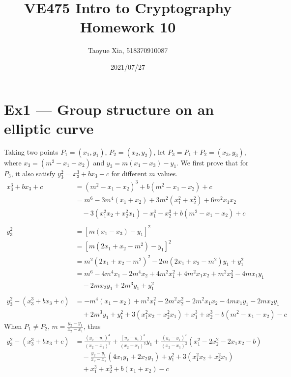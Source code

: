 \documentclass[12pt, a4paper]{article}
\begin{document}
\title{VE475 Intro to Cryptography Homework 10}
\author{Taoyue Xia, 518370910087}
\date{2021/07/27}
\maketitle

\section*{Ex1 --- Group structure on an elliptic curve}
Taking two points $P_1 = (x_1, y_1)$, $P_2 = (x_2, y_2)$, let $P_3 = P_1 + P_2 = (x_3, y_3)$, 
where $x_3 = (m^2 - x_1 - x_2)$ and $y_3 = m(x_1 - x_3) - y_1$. We first prove that for $P_3$, 
it also satisfy $y_3^2 = x_3^3 + bx_3 + c$ for different $m$ values. 
\begin{align*}
    x_3^3 + bx_3 + c &= (m^2 - x_1 - x_2)^3 + b(m^2 - x_1 - x_2) + c\\
                     &= m^6 - 3m^4(x_1 + x_2) + 3m^2(x_1^2 + x_2^2) + 6m^2x_1x_2 \\
                     &\quad - 3(x_1^2x_2 + x_2^2x_1) - x_1^3 - x_2^3 + b(m^2 - x_1 - x_2) + c\\
                     \\
            y_3^2    &= [m(x_1 - x_3) - y_1]^2\\
                     &= [m(2x_1 + x_2 - m^2) - y_1]^2\\
                     &= m^2(2x_1 + x_2 - m^2)^2 - 2m(2x_1 + x_2 - m^2)y_1 + y_1^2\\
                     &= m^6 - 4m^4x_1 - 2m^4x_2 + 4m^2x_1^2 + 4m^2x_1x_2 + m^2x_2^2 - 4mx_1y_1\\
                     &\quad - 2mx_2y_1 + 2m^3y_1 + y_1^2\\
                     \\
    y_3^2 - (x_3^3 + bx_3 + c) &= -m^4(x_1 - x_2) + m^2x_1^2 - 2m^2x_2^2 - 2m^2x_1x_2 - 4mx_1y_1 - 2mx_2y_1\\
                               &\quad + 2m^3y_1 + y_1^2 + 3(x_1^2x_2 + x_2^2x_1) + x_1^3 + x_2^3 - b(m^2 - x_1 - x_2) - c
\end{align*}
When $P_1 \neq P_2$, $m = \frac{y_2 - y_1}{x_2 - x_1}$, thus
\begin{align*}
    y_3^2 - (x_3^3 + bx_3 + c) &= \frac{(y_2 - y_1)^4}{(x_2 - x_1)^3} + \frac{(y_2 - y_1)^3}{(x_2 - x_1)^3} y_1
                                  + \frac{(y_2 - y_1)^2}{(x_2 - x_1)^2}(x_1^2 - 2x_2^2 - 2x_1x_2 - b)\\
                               &\quad -\frac{y_2 - y_1}{x_2 - x_1}(4x_1y_1 + 2x_2y_1) + y_1^2 + 3(x_1^2x_2 + x_2^2x_1)\\
                               &\quad + x_1^3 + x_2^3 + b(x_1 + x_2) - c
\end{align*}
\end{document}
